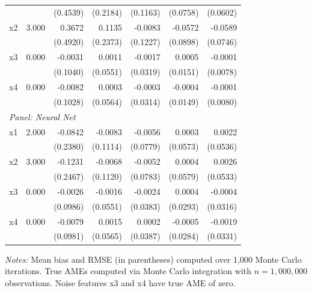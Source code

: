 \begin{table}[htbp]
\begin{threeparttable}
\begin{tabular}{lrrrrrr}
 &  & (0.4539) & (0.2184) & (0.1163) & (0.0758) & (0.0602) \\
\quad x2 & 3.000 & 0.3672 & 0.1135 & -0.0083 & -0.0572 & -0.0589 \\
 &  & (0.4920) & (0.2373) & (0.1227) & (0.0898) & (0.0746) \\
\quad x3 & 0.000 & -0.0031 & 0.0011 & -0.0017 & 0.0005 & -0.0001 \\
 &  & (0.1040) & (0.0551) & (0.0319) & (0.0151) & (0.0078) \\
\quad x4 & 0.000 & -0.0082 & 0.0003 & -0.0003 & -0.0004 & -0.0001 \\
 &  & (0.1028) & (0.0564) & (0.0314) & (0.0149) & (0.0080) \\
\midrule
\multicolumn{7}{l}{\textit{Panel: Neural Net}} \\
\quad x1 & 2.000 & -0.0842 & -0.0083 & -0.0056 & 0.0003 & 0.0022 \\
 &  & (0.2380) & (0.1114) & (0.0779) & (0.0573) & (0.0536) \\
\quad x2 & 3.000 & -0.1231 & -0.0068 & -0.0052 & 0.0004 & 0.0026 \\
 &  & (0.2467) & (0.1120) & (0.0783) & (0.0579) & (0.0533) \\
\quad x3 & 0.000 & -0.0026 & -0.0016 & -0.0024 & 0.0004 & -0.0004 \\
 &  & (0.0986) & (0.0551) & (0.0383) & (0.0293) & (0.0316) \\
\quad x4 & 0.000 & -0.0079 & 0.0015 & 0.0002 & -0.0005 & -0.0019 \\
 &  & (0.0981) & (0.0565) & (0.0387) & (0.0284) & (0.0331) \\
\bottomrule
\end{tabular}
\begin{tablenotes}
\footnotesize
\item \textit{Notes:} Mean bias and RMSE (in parentheses) computed over 1,000 Monte Carlo iterations. True AMEs computed via Monte Carlo integration with $n=1{,}000{,}000$ observations. Noise features x3 and x4 have true AME of zero.
\end{tablenotes}
\end{threeparttable}
\end{table}
